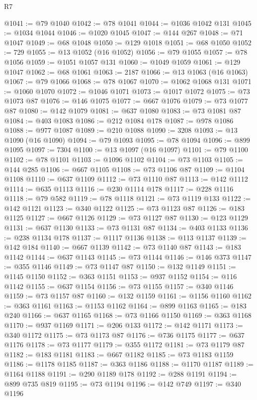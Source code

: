 \begin{lexlean}{R7}
\begin{coremodule}
@1041 := @79 @1040
@1042 := @78 @1041
@1044 := @1036 @1042 @131
@1045 := @1034 @1044
@1046 := @1020 @1045
@1047 := @144 @267
@1048 := @71 @1047
@1049 := @68 @1048
@1050 := @129 @1018
@1051 := @68 @1050
@1052 := 729
@1055 := @13 @1052 (@16 @1052)
@1056 := @79 @1055
@1057 := @78 @1056
@1059 := @1051 @1057 @131
@1060 := @1049 @1059
@1061 := @129 @1047
@1062 := @68 @1061
@1063 := 2187
@1066 := @13 @1063 (@16 @1063)
@1067 := @79 @1066
@1068 := @78 @1067
@1070 := @1062 @1068 @131
@1071 := @1060 @1070
@1072 := @1046 @1071
@1073 := @1017 @1072
@1075 := @73 @1073 @87
@1076 := @146 @1075
@1077 := @667 @1076
@1079 := @73 @1077 @87
@1080 := @142 @1079
@1081 := @637 @1080
@1083 := @73 @1081 @87
@1084 := @403 @1083
@1086 := @212 @1084 @178
@1087 := @978 @1086
@1088 := @977 @1087
@1089 := @210 @1088
@1090 := 3208
@1093 := @13 @1090 (@16 @1090)
@1094 := @79 @1093
@1095 := @78 @1094
@1096 := @899 @1095
@1097 := 7304
@1100 := @13 @1097 (@16 @1097)
@1101 := @79 @1100
@1102 := @78 @1101
@1103 := @1096 @1102
@1104 := @73 @1103
@1105 := @144 @285
@1106 := @667 @1105
@1108 := @73 @1106 @87
@1109 := @1104 @1108
@1110 := @637 @1109
@1112 := @73 @1110 @87
@1113 := @142 @1112
@1114 := @635 @1113
@1116 := @230 @1114 @178
@1117 := @228 @1116
@1118 := @79 @582
@1119 := @78 @1118
@1121 := @73 @1119 @133
@1122 := @142 @1121
@1123 := @340 @1122
@1125 := @73 @1123 @87
@1126 := @183 @1125
@1127 := @667 @1126
@1129 := @73 @1127 @87
@1130 := @123 @1129
@1131 := @637 @1130
@1133 := @73 @1131 @87
@1134 := @403 @1133
@1136 := @238 @1134 @178
@1137 := @1117 @1136
@1138 := @113 @1137
@1139 := @142 @184
@1140 := @667 @1139
@1142 := @73 @1140 @87
@1143 := @183 @1142
@1144 := @637 @1143
@1145 := @73 @1144
@1146 := @146 @373
@1147 := @355 @1146
@1149 := @73 @1147 @87
@1150 := @132 @1149
@1151 := @1145 @1150
@1152 := @363 @1151
@1153 := @937 @1152
@1154 := @116 @1142
@1155 := @637 @1154
@1156 := @73 @1155
@1157 := @340 @1146
@1159 := @73 @1157 @87
@1160 := @132 @1159
@1161 := @1156 @1160
@1162 := @363 @1161
@1163 := @1153 @1162
@1164 := @899 @1163
@1165 := @183 @240
@1166 := @637 @1165
@1168 := @73 @1166 @1150
@1169 := @363 @1168
@1170 := @937 @1169
@1171 := @206 @133
@1172 := @142 @1171
@1173 := @340 @1172
@1175 := @73 @1173 @87
@1176 := @736 @1175
@1177 := @637 @1176
@1178 := @73 @1177
@1179 := @355 @1172
@1181 := @73 @1179 @87
@1182 := @183 @1181
@1183 := @667 @1182
@1185 := @73 @1183 @1159
@1186 := @1178 @1185
@1187 := @363 @1186
@1188 := @1170 @1187
@1189 := @1164 @1188
@1191 := @290 @1189 @178
@1192 := @288 @1191
@1194 := @899 @735 @819
@1195 := @73 @1194
@1196 := @142 @749
@1197 := @340 @1196

\end{coremodule}
\end{lexlean}
